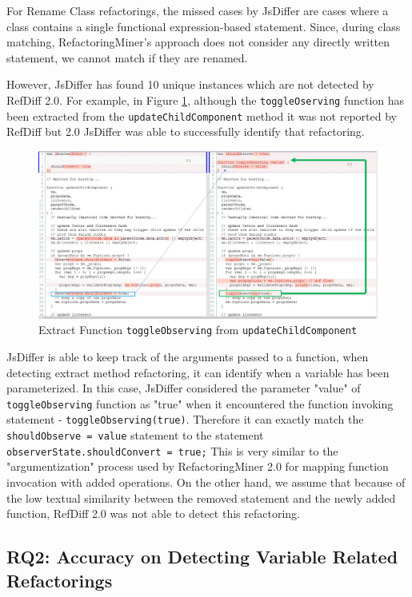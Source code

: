 \documentclass[letterpaper,12pt,onecolumn,final]{report}
\begin{document}
For Rename Class refactorings, the missed cases by JsDiffer are cases where a class contains a single functional expression-based statement. Since, during class matching, RefactoringMiner's approach does not consider any directly written statement, we cannot match if they are renamed.


However, JsDiffer has found 10 unique instances which are not detected by RefDiff 2.0. For example, in Figure \ref{fig:extractToggle}, although the \texttt{toggleOserving} function has been extracted from the \texttt{updateChildComponent} method it was not reported by RefDiff but 2.0 JsDiffer was able to successfully identify that refactoring.

\begin{figure}
\includegraphics[width=\textwidth,height=\textheight,keepaspectratio]{extracttoggleObserving}
  \caption{Extract Function \texttt{toggleObserving} from \texttt{updateChildComponent}}
   \label{fig:extractToggle}
\end{figure}

JsDiffer is able to keep track of the arguments passed to a function, when detecting extract method refactoring, it can identify when a variable has been parameterized. In this case, JsDiffer considered the parameter "value" of \texttt{toggleObserving} function as "true" when it encountered the function invoking statement - \texttt{toggleObserving(true)}. Therefore it can exactly match the \texttt{shouldObserve = value} statement to the statement \texttt{observerState.shouldConvert = true;} This is very similar to the "argumentization" process used by RefactoringMiner 2.0 for mapping function invocation with added operations. On the other hand, we assume that because of the low textual similarity between the removed statement and the newly added function, RefDiff 2.0 was not able to detect this refactoring.

\subsection{RQ2: Accuracy on Detecting Variable Related Refactorings}
\end{document}
